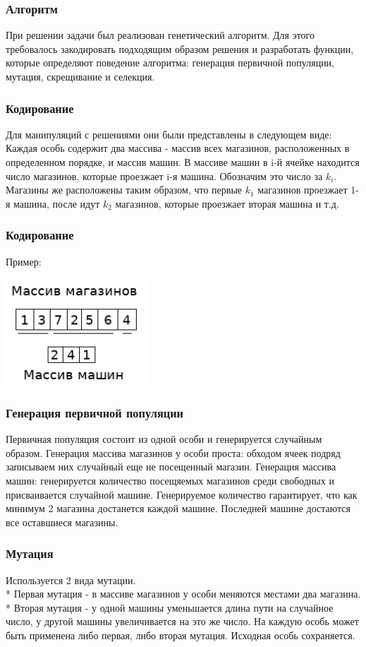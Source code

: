 \documentclass{beamer}
\begin{document}
\begin{frame}
    \frametitle{Алгоритм}
    При решении задачи был реализован генетический алгоритм. Для этого требовалось
    закодировать подходящим образом решения и разработать функции, которые
    определяют поведение алгоритма: генерация первичной популяции, мутация, скрещивание и селекция.
\end{frame}
\begin{frame}
    \frametitle{Кодирование}
    Для манипуляций с решениями они были представлены в следующем виде:
    Каждая особь содержит два массива - массив всех магазинов, расположенных
    в определенном порядке, и массив машин. В массиве машин в i-й ячейке находится
    число магазинов, которые проезжает i-я машина. Обозначим это число за \(k_i\).
    Магазины же расположены таким образом, что первые \(k_1\) магазинов проезжает
    1-я машина, после идут \(k_2\) магазинов, которые проезжает вторая машина и т.д.
\end{frame}
\begin{frame}
    \frametitle{Кодирование}
    Пример:
    \begin{center}
        \includegraphics[height=4cm]{encoding.png}
    \end{center}
\end{frame}
\begin{frame}
    \frametitle{Генерация первичной популяции}
    Первичная популяция состоит из одной особи и генерируется
    случайным образом. 
    Генерация массива магазинов у особи проста: обходом ячеек подряд
    записываем них случайный еще не посещенный магазин.
    Генерация массива машин: генерируется количество посещяемых
    магазинов среди свободных и присваивается случайной машине.
    Генерируемое количество гарантирует, что как минимум 2 магазина
    достанется каждой машине. Последней машине достаются все оставшиеся
    магазины.
\end{frame}
\begin{frame}
    \frametitle{Мутация}
    Используется 2 вида мутации.\\*
    Первая мутация - в массиве магазинов у особи меняются местами два магазина.\\*
    Вторая мутация - у одной машины уменьшается длина пути на случайное число, у другой машины увеличивается на это же число.
    На каждую особь может быть применена либо первая, либо вторая мутация. Исходная особь сохраняется.
\end{frame}
\end{document}
